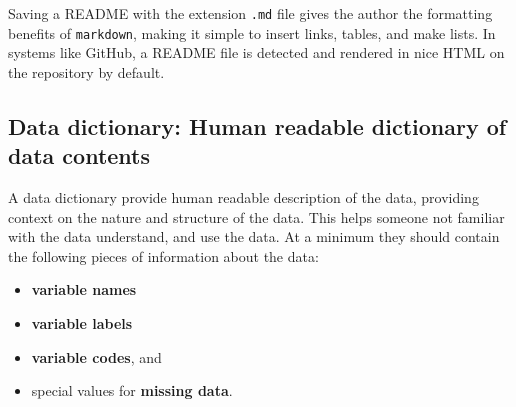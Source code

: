 \documentclass[
]{article}
\providecommand{\tightlist}{%
  \setlength{\itemsep}{0pt}\setlength{\parskip}{0pt}}
\begin{document}
Saving a README with the extension \texttt{.md} file gives the author the formatting benefits of \texttt{markdown}, making it simple to insert links, tables, and make lists. In systems like GitHub, a README file is detected and rendered in nice HTML on the repository by default.

\hypertarget{data-dictionary}{%
\subsection{Data dictionary: Human readable dictionary of data contents}\label{data-dictionary}}

A data dictionary provide human readable description of the data, providing context on the nature and structure of the data. This helps someone not familiar with the data understand, and use the data. At a minimum they should contain the following pieces of information about the data:

\begin{itemize}
\tightlist
\item
  \textbf{variable names}
\item
  \textbf{variable labels}
\item
  \textbf{variable codes}, and
\item
  special values for \textbf{missing data}.
\end{itemize}
\end{document}
